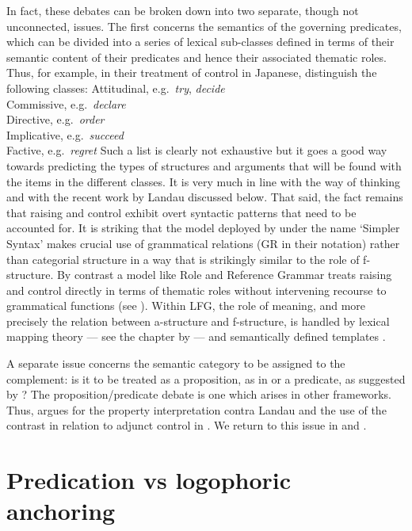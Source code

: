 \documentclass[output=paper,hidelinks]{langscibook}
\begin{document}
In fact, these debates can be broken down into two separate, though not unconnected, issues. The first concerns the semantics of the governing predicates, which can be divided into a series of lexical sub-classes defined in terms of their semantic content of their predicates and hence their associated thematic roles. Thus, for example, in their treatment of control in Japanese, \citet{AkuzawaKubota2020} distinguish the following classes:
\ea
Attitudinal, e.g.\ \emph{try}, \emph{decide}\\
Commissive, e.g.\ \emph{declare}\\
Directive, e.g.\ \emph{order}\\
Implicative, e.g.\ \emph{succeed}\\
Factive, e.g.\ \emph{regret}
\z
Such a list is clearly not exhaustive but it goes a good way towards predicting the types of structures and arguments that will be found with the items in the different classes. It is very much in line with the \citeauthor{CulicoverJackendoff2006} way of thinking and with the recent work by Landau discussed below. That said, the fact remains that raising and control exhibit overt syntactic patterns that need to be accounted for. It is striking that the model deployed by \citeauthor{CulicoverJackendoff2006} under the name `Simpler Syntax' makes crucial use of grammatical relations (GR in their notation) rather than categorial structure in a way that is strikingly similar to the role of f-structure. By contrast a model like Role and Reference Grammar treats raising and control directly in terms of thematic roles without intervening recourse to grammatical functions (see ). Within LFG, the role of meaning, and more precisely the relation between a-structure and f-structure, is handled by lexical mapping theory --- see the chapter by  --- and semantically defined templates \citep[230--237]{DLM:LFG}.

A separate issue concerns the semantic category to be assigned to the complement: is it to be treated as a proposition, as in \citet{dalrymple01} or a predicate, as suggested by \citet{Asudeh05cont}? The proposition/predicate debate is one which arises in other frameworks. Thus, \citet{Pearson2016} argues for the property interpretation contra Landau and the use of the contrast in relation to adjunct control in \citet{Landau2021}. We return to this issue in  and .

\section{Predication vs logophoric anchoring}
\label{sec:Control:11}
\end{document}
